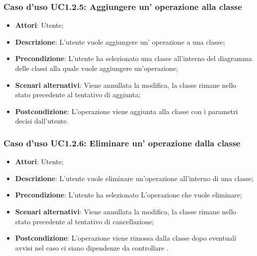 \documentclass[a4paper]{report}
\begin{document}
\subsubsection{Caso d'uso UC1.2.5: Aggiungere un' operazione alla classe}
\begin{itemize}
	\item \textbf{Attori}: Utente;
	
	\item \textbf{Descrizione}: L'utente vuole aggiungere un' operazione a una classe;
	
	\item \textbf{Precondizione}: L'utente ha selezionato una classe all'interno del diagramma delle classi alla quale vuole aggiungere un'operazione;
	
	\item \textbf{Scenari alternativi}: Viene annullata la modifica, la classe
	rimane nello stato precedente al tentativo di aggiunta;
	
	\item \textbf{Postcondizione}: L'operazione viene aggiunta alla classe con i parametri decisi dall'utente.
\end{itemize}

\subsubsection{Caso d'uso UC1.2.6: Eliminare un' operazione dalla classe}
\begin{itemize}
	\item \textbf{Attori}: Utente;
	
	\item \textbf{Descrizione}: L'utente vuole eliminare un'operazione all'interno di una classe;
	
	\item \textbf{Precondizione}: L'utente ha selezionato L'operazione che vuole eliminare;
	
	\item \textbf{Scenari alternativi}: Viene annullata la modifica, la classe
	rimane nello stato precedente al tentativo di cancellazione;
	
	\item \textbf{Postcondizione}: L'operazione viene rimossa dalla classe dopo
	 eventuali avvisi nel caso ci siano dipendenze da controllare .
\end{itemize}
\end{document}
